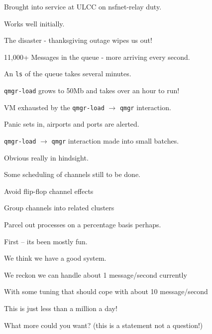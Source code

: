 \begin{bwslide}
\begin{nrtc}
\item	Brought into service at ULCC on nsfnet-relay duty.
\item	Works well initially.
\item	The disaster - thanksgiving outage wipes us out!
\item	11,000+ Messages in the queue - more arriving every second.
\item	An \verb|ls| of the queue takes several minutes.
\item	\verb|qmgr-load| grows to 50Mb and takes over an hour to run!
\item	VM exhausted by the \verb|qmgr-load| $\rightarrow$
	 \verb|qmgr| interaction.
\item	Panic sets in, airports and ports are alerted.
\end{nrtc}
\end{bwslide}

\begin{bwslide}
\begin{nrtc}
\item	\verb|qmgr-load| $\rightarrow$ \verb|qmgr| interaction made
	into small batches.
\item	Obvious really in hindsight.
\item	Some scheduling of channels still to be done.
\item	Avoid flip-flop channel effects
\item	Group channels into related clusters
\item	Parcel out processes on a percentage basis perhaps.
\end{nrtc}
\end{bwslide}

\begin{bwslide}

\begin{nrtc}
\item	First -- its been mostly fun.
\item	We think we have a good system.
\item	We reckon we can handle about 1 message/second currently
\item	With some tuning that should cope with about 10 message/second
\item	This is just less than a million a day!
\item	What more could you want? (this is a statement not a question!)
\end{nrtc}
\end{bwslide}


